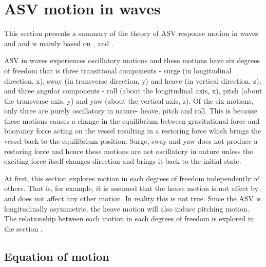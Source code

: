 \section{ASV motion in waves} \label{ASV motion in waves}
This section presents a summary of the theory of ASV response motion in waves
and and is mainly based on \cite{lewis1988principles},
\cite{bhattacharyya1978dynamics} and \cite{barltrop2013dynamics}.

ASV in waves experiences oscillatory motions and these motions have six degrees
of freedom that is three transitional components - surge (in longitudinal
direction, x), sway (in transverse direction, y) and heave (in vertical
direction, z), and three angular components - roll (about the longitudinal axis,
x), pitch (about the transverse axis, y) and yaw (about the vertical axis, z).
Of the six motions, only three are purely oscillatory in nature- heave, pitch
and roll. This is because these motions causes a change in the equilibrium
between gravitational force and buoyancy force acting on the vessel resulting in
a restoring force which brings the vessel back to the equilibrium position.
Surge, sway and yaw does not produce a restoring force and hence these motions
are not oscillatory in nature unless the exciting force itself changes direction
and brings it back to the initial state.

At first, this section explores motion in each degrees of freedom independently
of others. That is, for example, it is assumed that the heave motion is not
affect by and does not affect any other motion. In reality this is not true.
Since the ASV is longitudinally asymmetric, the heave motion will also induce
pitching motion. The relationship between each motion in each degrees of freedom
is explored in the section .

\subsection{Equation of motion}

